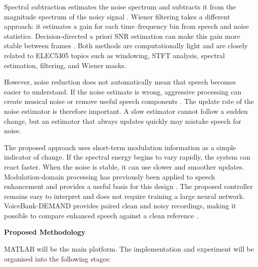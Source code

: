 \documentclass[11pt,a4paper]{article}
\newcommand{\projectsection}[1]{%
  \vspace{0.3em}%
  {\large\bfseries\color{accent} #1}\par
  \vspace{0.15em}%
}
\begin{document}
Spectral subtraction estimates the noise spectrum and subtracts it from the magnitude spectrum of the noisy signal \cite{boll1979}. Wiener filtering takes a different approach: it estimates a gain for each time--frequency bin from speech and noise statistics. Decision-directed a priori SNR estimation can make this gain more stable between frames \cite{scalart1996}. Both methods are computationally light and are closely related to ELEC5305 topics such as windowing, STFT analysis, spectral estimation, filtering, and Wiener masks.

However, noise reduction does not automatically mean that speech becomes easier to understand. If the noise estimate is wrong, aggressive processing can create musical noise or remove useful speech components \cite{loizou2011}. The update rate of the noise estimator is therefore important. A slow estimator cannot follow a sudden change, but an estimator that always updates quickly may mistake speech for noise.

The proposed approach uses short-term modulation information as a simple indicator of change. If the spectral energy begins to vary rapidly, the system can react faster. When the noise is stable, it can use slower and smoother updates. Modulation-domain processing has previously been applied to speech enhancement and provides a useful basis for this design \cite{paliwal2009}. The proposed controller remains easy to interpret and does not require training a large neural network. VoiceBank-DEMAND provides paired clean and noisy recordings, making it possible to compare enhanced speech against a clean reference \cite{voicebank2017,valentini2018}.

\projectsection{Proposed Methodology}

MATLAB will be the main platform. The implementation and experiment will be organised into the following stages:
\end{document}
